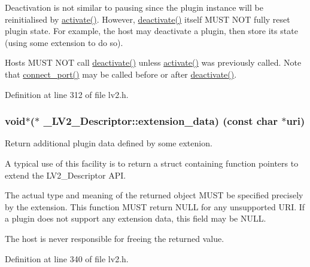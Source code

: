 Deactivation is not similar to pausing since the plugin instance will be reinitialised by \hyperlink{struct___l_v2___descriptor_ad6bfac334042df6d51f4f0f7c0a72241}{activate()}. However, \hyperlink{struct___l_v2___descriptor_ab010fd53849be3de9beb99d7d936ab9c}{deactivate()} itself M\+U\+ST N\+OT fully reset plugin state. For example, the host may deactivate a plugin, then store its state (using some extension to do so).

Hosts M\+U\+ST N\+OT call \hyperlink{struct___l_v2___descriptor_ab010fd53849be3de9beb99d7d936ab9c}{deactivate()} unless \hyperlink{struct___l_v2___descriptor_ad6bfac334042df6d51f4f0f7c0a72241}{activate()} was previously called. Note that \hyperlink{struct___l_v2___descriptor_a7c6a66b45322444b14e6d0fc27da62d5}{connect\+\_\+port()} may be called before or after \hyperlink{struct___l_v2___descriptor_ab010fd53849be3de9beb99d7d936ab9c}{deactivate()}. 

Definition at line 312 of file lv2.\+h.

\subsubsection[{\texorpdfstring{extension\+\_\+data}{extension_data}}]{ {\bf void}$\ast$($\ast$ \+\_\+\+L\+V2\+\_\+\+Descriptor\+::extension\+\_\+data) ({\bf const} char $\ast${\bf uri})}\hypertarget{struct___l_v2___descriptor_a36da63991720b8ed2990d666b8369669}{}\label{struct___l_v2___descriptor_a36da63991720b8ed2990d666b8369669}
Return additional plugin data defined by some extenion.

A typical use of this facility is to return a struct containing function pointers to extend the L\+V2\+\_\+\+Descriptor A\+PI.

The actual type and meaning of the returned object M\+U\+ST be specified precisely by the extension. This function M\+U\+ST return N\+U\+LL for any unsupported U\+RI. If a plugin does not support any extension data, this field may be N\+U\+LL.

The host is never responsible for freeing the returned value. 

Definition at line 340 of file lv2.\+h.

